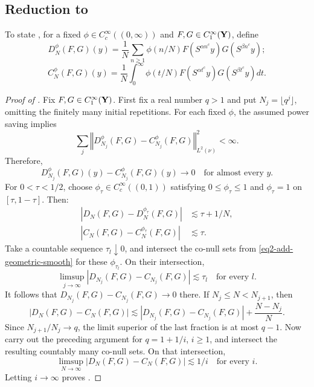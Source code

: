 \documentclass[reqno,12pt]{amsart}
\newtheorem{lemma}[thm]{Lemma}
\newcommand{\norm}[1]{\left\Vert #1\right\Vert}
\numberwithin{equation}{section}
\begin{document}
\subsection{Reduction to \texorpdfstring{}{Theorem~}}
To state , for a fixed $\phi \in C^{\infty}_{c}((0,\infty))$ and $F,G\in C^{\infty}_{1}({\bf Y})$, define
$$D_{N}^{\phi}(F,G)(y)=\frac{1}{N}\sum_{n\ge 1}\phi(n/N)F(S^{\alpha n^c}y)G(S^{\beta n^c}y);$$
$$C_N^{\phi}(F,G)(y)=\frac{1}{N}\int_{0}^{\infty}\phi(t/N)F(S^{\alpha t^c}y)G(S^{\beta t^c}y)dt.$$
\begin{proof}[Proof of ]
Fix $F,G\in C_1^\infty({\bf Y})$. First fix a real number $q>1$ and put
$N_j=\lfloor q^j\rfloor$, omitting the finitely many initial repetitions.
For each fixed $\phi$, the assumed power saving implies
\[
 \sum_j \norm{D_{N_j}^\phi(F,G)-C_{N_j}^\phi(F,G)}_{L^2(\nu)}^2<\infty.
\]
Therefore,
\begin{equation}
 D_{N_j}^\phi(F,G)(y)-C_{N_j}^\phi(F,G)(y)\longrightarrow0
 \quad\text{for almost every }y.
 \label{eq2-add-geometric-smooth}
\end{equation}
For $0<\tau<1/2$, choose $\phi_\tau\in C_c^\infty((0,1))$ satisfying
$0\le\phi_\tau\le1$ and $\phi_\tau=1$ on $[\tau,1-\tau]$. Then:
\begin{align}
 |D_N(F,G)-D_N^{\phi_\tau}(F,G)|&\lesssim\tau+1/N,
 \label{eq2-add-time-cutoff-discrete}\\
 |C_N(F,G)-C_N^{\phi_\tau}(F,G)|&\lesssim\tau.
 \label{eq2-add-time-cutoff-continuous}
\end{align}
Take a countable sequence $\tau_l\downarrow0$, and intersect the co-null
sets from \eqref{eq2-add-geometric-smooth} for these $\phi_{\tau_l}$.
On their intersection,
\[
 \limsup_{j\to\infty}|D_{N_j}(F,G)-C_{N_j}(F,G)|\lesssim\tau_l
 \quad\text{for every }l.
\]
It follows that $D_{N_j}(F,G)-C_{N_j}(F,G)\to0$ there.
If $N_j\le N<N_{j+1}$, then
\[
 |D_N(F,G)-C_N(F,G)|
 \lesssim |D_{N_j}(F,G)-C_{N_j}(F,G)|+\frac{N-N_j}{N}.
\]
Since $N_{j+1}/N_j\to q$, the limit superior of the last fraction is at
most $q-1$. Now carry out the preceding argument for
$q=1+1/i$, $i\ge1$, and intersect the resulting countably many co-null
sets. On that intersection,
\[
 \limsup_{N\to\infty}|D_N(F,G)-C_N(F,G)|\lesssim1/i
 \quad\text{for every }i.
\]
Letting $i\to\infty$ proves .
\end{proof}
\end{document}
